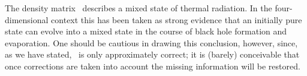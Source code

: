 %


The density matrix \weig\ describes a mixed state of thermal radiation.  In
the four-dimensional context this has been taken as strong evidence that
an initially pure state can evolve into a mixed state in the course of
black hole formation and evaporation.  One should be cautious in drawing
this conclusion, however, since, as we have stated, \weig\ is only
approximately
correct; it is (barely) conceivable that once corrections are taken into
account the missing information will be restored.

